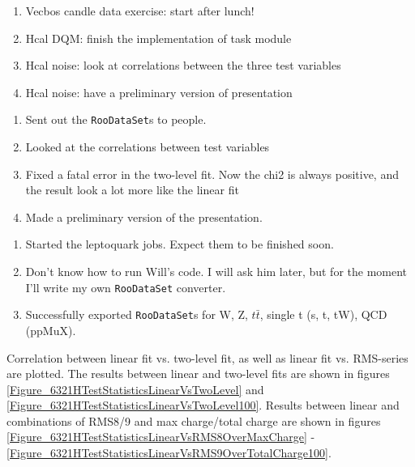 

\begin{enumerate}
\item Vecbos candle data exercise: start after lunch!
\item Hcal DQM: finish the implementation of task module
\item Hcal noise: look at correlations between the three test variables
\item Hcal noise: have a preliminary version of presentation
\end{enumerate}


\begin{enumerate}
\item Sent out the \texttt{RooDataSet}s to people.
\item Looked at the correlations between test variables
\item Fixed a fatal error in the two-level fit.  Now the chi2 is always positive, and the result look a lot more like the linear fit
\item Made a preliminary version of the presentation.
\end{enumerate}


\begin{enumerate}
\item Started the leptoquark jobs.  Expect them to be finished soon.
\item Don't know how to run Will's code.  I will ask him later, but for the moment I'll write my own \texttt{RooDataSet} converter.
\item Successfully exported \texttt{RooDataSet}s for W, Z, $t\bar{t}$, single t (s, t, tW), QCD (ppMuX).
\end{enumerate}


Correlation between linear fit vs. two-level fit, as well as linear fit vs. RMS-series are plotted.
The results between linear and two-level fits are shown in figures \ref{Figure_6321HTestStatisticsLinearVsTwoLevel}
and \ref{Figure_6321HTestStatisticsLinearVsTwoLevel100}.  Results between linear and combinations
of RMS8/9 and max charge/total charge are shown in figures \ref{Figure_6321HTestStatisticsLinearVsRMS8OverMaxCharge}
- \ref{Figure_6321HTestStatisticsLinearVsRMS9OverTotalCharge100}.

